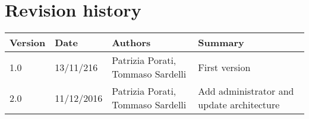 \section{Revision history}

\begin{tabular}{|l|l|l|p{4cm}|}
	\hline
	\textbf{Version}	& \textbf{Date}	& \textbf{Authors}	& \textbf{Summary}\\
	\hline
	1.0 	& 13/11/216 	& Patrizia Porati, Tommaso Sardelli 	& First version\\
	\hline
	2.0 	& 11/12/2016 	& Patrizia Porati, Tommaso Sardelli 	& Add administrator and update architecture\\
	\hline
\end{tabular}